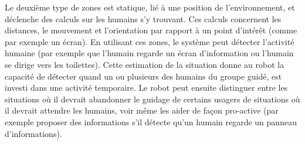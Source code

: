 \documentclass[a4paper,11pt,twoside]{StyleThese}
\begin{document}
Le deuxième type de zones est statique, lié à une position de l'environnement, et déclenche des calculs sur les humains s'y trouvant. Ces calculs concernent les distances, le mouvement et l'orientation par rapport à un point d'intérêt (comme par exemple un écran). En utilisant ces zones, le système peut détecter l'activité humaine (par exemple que l'humain regarde un écran d'information ou l'humain se dirige vers les toilettes). Cette estimation de la situation donne au robot la capacité de détecter quand un ou plusieurs des humains du groupe guidé, est investi dans une activité temporaire. Le robot peut ensuite distinguer entre les situations où il devrait abandonner le guidage de certains usagers de situations où il devrait attendre les humains, voir même les aider de façon pro-active (par exemple proposer des informations s'il détecte qu'un humain regarde un panneau d'informations).




%

\end{document}
